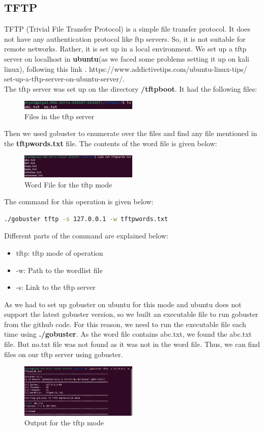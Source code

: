 \documentclass[12 pt]{article}
\begin{document}
\subsection{TFTP}
TFTP (Trivial File Transfer Protocol) is a simple file transfer protocol. It does not have any authentication protocol like ftp servers. So, it is not suitable for remote networks. Rather, it is set up in a local environment. We set up a tftp server on localhost in \textbf{ubuntu}(as we faced some problems setting it up on kali linux), following this link \cite{tftp}.
{https://www.addictivetips.com/ubuntu-linux-tips/
set-up-a-tftp-server-on-ubuntu-server/}.\\
The tftp server was set up on the directory \textbf{/tftpboot}. It had the following files:
\begin{figure}[!htbp]
    \centering
    \includegraphics[width=0.5\textwidth]{tftp_Server_Files.png}
    \caption{Files in the tftp server}
    \label{fig: tftp Server Files}
\end{figure}
Then we used gobuster to enumerate over the files and find any file mentioned in the \textbf{tftpwords.txt} file. The contents of the word file is given below:
\begin{figure}[!htbp]
    \centering
    \includegraphics[width=0.5\textwidth]{tftp_Word_File.png}
    \caption{Word File for the tftp mode}
    \label{fig: tftp Word File}
\end{figure}
The command for this operation is given below:
\begin{lstlisting}[language=bash]
./gobuster tftp -s 127.0.0.1 -w tftpwords.txt
\end{lstlisting}
Different parts of the command are explained below:
\begin{itemize}
    \item tftp: tftp mode of operation
    \item -w: Path to the wordlist file
    \item -s: Link to the tftp server
\end{itemize}
As we had to set up gobuster on ubuntu for this mode and ubuntu does not support the latest gobuster version, so we built an executable file to run gobuster from the github code. For this reason, we need to run the executable file each time using \textbf{./gobuster}. As the word file contains abc.txt, we found the abc.txt file. But no.txt file was not found as it was not in the word file. Thus, we can find files on our tftp server using gobuster.
\begin{figure}[!htbp]
    \centering
    \includegraphics[width=0.5\textwidth]{tftp_Output.png}
    \caption{Output for the tftp mode}
    \label{fig: tftp Output}
\end{figure}
\printbibliography[title={References}]
\end{document}
